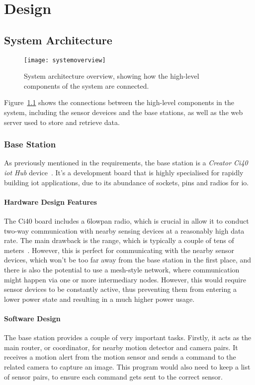\chapter{Design}

\section{System Architecture}

\begin{figure}[h]
  \label{overviewfigure}
  \centering
  \texttt{[image: systemoverview]}
  \caption{System architecture overview, showing how the high-level components of the system are connected.}
\end{figure}

Figure~\ref{overviewfigure} shows the connections between the high-level
components in the system, including the sensor deveices and the base
stations, as well as the web server used to store and retrieve data.

\subsection{Base Station}
As previously mentioned in the requirements, the base station is a
\textit{Creator Ci40 \acrshort{iot} Hub} device~\cite{creatorci40}. It's a
development board that is highly specialised for rapidly building
\acrlong{iot} applications, due to its abundance of sockets, pins and radios
for \acrshort{io}.

\subsubsection{Hardware Design Features}

The Ci40 board includes a \gls{6lowpan} radio, which is crucial in allow it
to conduct two-way communication with nearby sensing devices at a reasonably
high data rate. The main drawback is the range, which is typically a couple
of tens of meters~\cite{culler20096lowpan}. However, this is perfect for
communicating with the nearby sensor devices, which won't be too far away
from the base station in the first place, and there is also the potential to
use a mesh-style network, where communication might happen via one or more
intermediary nodes. However, this would require sensor devices to be
constantly active, thus preventing them from entering a lower power state and
resulting in a much higher power usage.

\subsubsection{Software Design}
The base station provides a couple of very important tasks. Firstly, it acts
as the main router, or coordinator, for nearby motion detector and camera
pairs. It receives a motion alert from the motion sensor and sends a command
to the related camera to capture an image. This program would also need to
keep a list of sensor pairs, to ensure each command gets sent to the correct
sensor.

